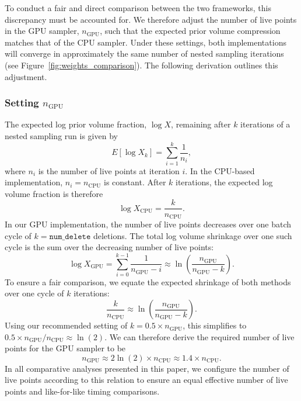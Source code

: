 \documentclass[fleqn,usenatbib]{mnras}
\begin{document}
To conduct a fair and direct comparison between the two frameworks, this
discrepancy must be accounted for. We therefore adjust the number of
live points in the GPU sampler, $n_{\text{GPU}}$, such that the
expected prior volume compression matches that of the CPU sampler. 
Under these settings, both implementations will converge in
approximately the same number of nested sampling iterations (see Figure~\ref{fig:weights_comparison}). 
The following derivation outlines this adjustment.

\subsubsection{Setting $n_{\text{GPU}}$}
\label{sec:setting_n_gpu}

The expected log prior volume fraction, $\log X$, remaining after $k$ iterations
of a nested sampling run is given by~\citep{skilling, dynamic_ns, aeons}
\begin{equation}
    E[\log X_k] = \sum_{i=1}^{k} \frac{1}{n_i},
\end{equation}
where $n_i$ is the number of live points at iteration $i$. In the
CPU-based implementation, $n_i = n_{\text{CPU}}$ is constant.
After $k$ iterations, the expected log volume fraction is therefore
\begin{equation}
    \log X_{\text{CPU}} = \frac{k}{n_{\text{CPU}}}.
\end{equation}
In our GPU implementation, the number of live points decreases over one
batch cycle of $k = \texttt{num\_delete}$ deletions. The total log
volume shrinkage over one such cycle is the sum over the decreasing
number of live points:
\begin{equation}
    \log X_{\text{GPU}} = \sum_{i=0}^{k-1} \frac{1}{n_{\text{GPU}}-i} \approx \ln\left(\frac{n_{\text{GPU}}}{n_{\text{GPU}}-k}\right).
\end{equation}
To ensure a fair comparison, we equate the expected shrinkage of both
methods over one cycle of $k$ iterations:
\begin{equation}
    \frac{k}{n_{\text{CPU}}} \approx \ln\left(\frac{n_{\text{GPU}}}{n_{\text{GPU}}-k}\right).
\end{equation}
Using our recommended setting of $k = 0.5 \times n_{\text{GPU}}$, this
simplifies to $0.5 \times n_{\text{GPU}} / n_{\text{CPU}} \approx \ln(2)$.
We can therefore derive the required number of live points for the GPU
sampler to be
\begin{equation}
    n_{\text{GPU}} \approx 2 \ln(2) \times n_{\text{CPU}} \approx 1.4 \times n_{\text{CPU}}.
\end{equation}
In all comparative analyses presented in this paper, we configure the
number of live points according to this relation to ensure an equal 
effective number of live points and
like-for-like timing comparisons.
\end{document}
